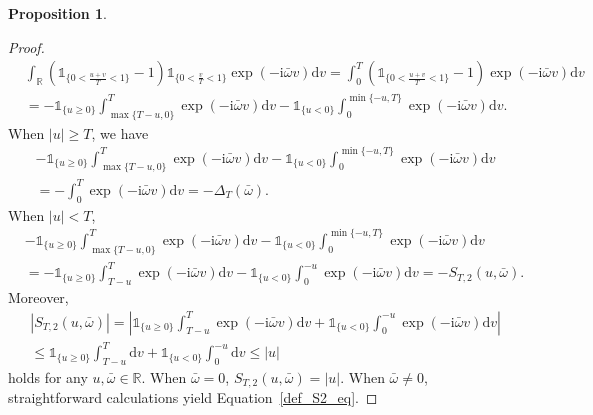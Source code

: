 \documentclass[11pt]{article}
\numberwithin{equation}{section}
\theoremstyle{plain}
\theoremstyle{definition}
\theoremstyle{definition}
\theoremstyle{assumption}
\theoremstyle{proposition}
\newtheorem{proposition}{Proposition}[section]
\theoremstyle{proposition}
\theoremstyle{example}
\theoremstyle{lemma}
\theoremstyle{theorem}
\theoremstyle{remark}
\begin{document}
\begin{proposition}
\begin{proof}
\begin{align*}
&\int_{\mathbb{R}}( \mathds{1}_{\{0<\frac{u+v}{T}<1\}} - 1 )\mathds{1}_{\{0<\frac{v}{T}<1\}}\exp(-\mathrm{i}\bar{\omega}v)\mathrm{d}v
=\int_{0}^T( \mathds{1}_{\{0<\frac{u+v}{T}<1\}} - 1 )\exp(-\mathrm{i}\bar{\omega}v)\mathrm{d}v \\
&=-\mathds{1}_{\{u\geqslant0\}}\int_{\max\{T-u, 0\}}^T\exp(-\mathrm{i}\bar{\omega}v)\mathrm{d}v
-\mathds{1}_{\{u<0\}}\int_{0}^{\min\{-u, T\}}\exp(-\mathrm{i}\bar{\omega}v)\mathrm{d}v.
\end{align*}
When $|u|\geqslant T$, we have
\begin{align*}
&-\mathds{1}_{\{u\geqslant0\}}\int_{\max\{T-u, 0\}}^T\exp(-\mathrm{i}\bar{\omega}v)\mathrm{d}v
-\mathds{1}_{\{u<0\}}\int_{0}^{\min\{-u, T\}}\exp(-\mathrm{i}\bar{\omega}v)\mathrm{d}v \\
&=-\int_{0}^T\exp(-\mathrm{i}\bar{\omega}v)\mathrm{d}v
=-\Delta_T(\bar{\omega}) .
\end{align*}
When $|u|< T$,
\begin{align*}
&-\mathds{1}_{\{u\geqslant0\}}\int_{\max\{T-u, 0\}}^T\exp(-\mathrm{i}\bar{\omega}v)\mathrm{d}v
-\mathds{1}_{\{u<0\}}\int_{0}^{\min\{-u, T\}}\exp(-\mathrm{i}\bar{\omega}v)\mathrm{d}v \\
&=-\mathds{1}_{\{u\geqslant0\}}\int_{T-u}^T\exp(-\mathrm{i}\bar{\omega}v)\mathrm{d}v
-\mathds{1}_{\{u<0\}}\int_{0}^{-u}\exp(-\mathrm{i}\bar{\omega}v)\mathrm{d}v
=-S_{T,2}(u,\bar{\omega}).
\end{align*}
Moreover,
\begin{align*}
&|S_{T,2}(u,\bar{\omega})|
=\left|\mathds{1}_{\{u\geqslant0\}}\int_{T-u}^T\exp(-\mathrm{i}\bar{\omega}v)\mathrm{d}v
+\mathds{1}_{\{u<0\}}\int_{0}^{-u}\exp(-\mathrm{i}\bar{\omega}v)\mathrm{d}v \right| \\
&\leqslant \mathds{1}_{\{u\geqslant0\}}\int_{T-u}^T\mathrm{d}v
+\mathds{1}_{\{u<0\}}\int_{0}^{-u}\mathrm{d}v 
\leqslant |u|
\end{align*}
holds for any $u,\bar{\omega}\in\mathbb{R}$. When $\bar{\omega} = 0$, $S_{T,2}(u,\bar{\omega}) = |u|$. When $\bar{\omega} \neq 0$, straightforward calculations yield Equation~\eqref{def_S2_eq}.
\end{proof}
\end{proposition}
\end{document}
